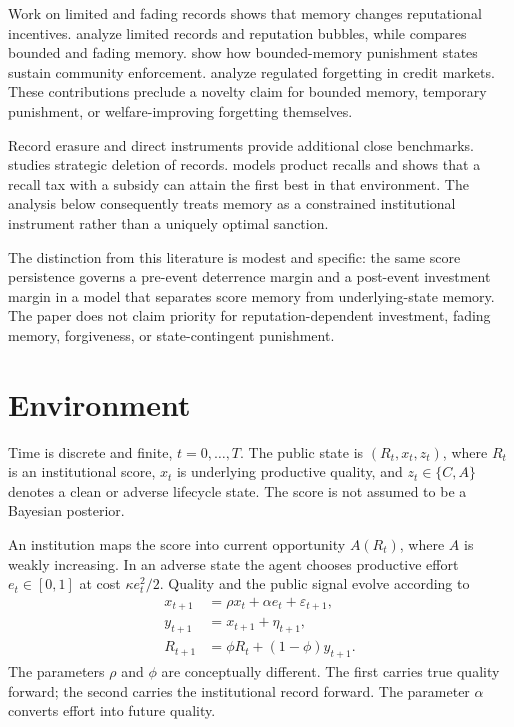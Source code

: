 \documentclass[11pt]{article}
\begin{document}
Work on limited and fading records shows that memory changes reputational incentives. \citet{liuskrzypacz2014} analyze limited records and reputation bubbles, while \citet{sperisen2018} compares bounded and fading memory. \citet{bhaskarthomas2019} show how bounded-memory punishment states sustain community enforcement. \citet{elulgottardi2015} analyze regulated forgetting in credit markets. These contributions preclude a novelty claim for bounded memory, temporary punishment, or welfare-improving forgetting themselves.

Record erasure and direct instruments provide additional close benchmarks. \citet{pei2026} studies strategic deletion of records. \citet{jovanovic2021} models product recalls and shows that a recall tax with a subsidy can attain the first best in that environment. The analysis below consequently treats memory as a constrained institutional instrument rather than a uniquely optimal sanction.

The distinction from this literature is modest and specific: the same score persistence governs a pre-event deterrence margin and a post-event investment margin in a model that separates score memory from underlying-state memory. The paper does not claim priority for reputation-dependent investment, fading memory, forgiveness, or state-contingent punishment.

\section{Environment}

Time is discrete and finite, $t=0,\ldots,T$. The public state is $(R_t,x_t,z_t)$, where $R_t$ is an institutional score, $x_t$ is underlying productive quality, and $z_t\in\{C,A\}$ denotes a clean or adverse lifecycle state. The score is not assumed to be a Bayesian posterior.

An institution maps the score into current opportunity $A(R_t)$, where $A$ is weakly increasing. In an adverse state the agent chooses productive effort $e_t\in[0,1]$ at cost $\kappa e_t^2/2$. Quality and the public signal evolve according to
\begin{align}
x_{t+1}&=\rho x_t+\alpha e_t+\varepsilon_{t+1},\\
y_{t+1}&=x_{t+1}+\eta_{t+1},\\
R_{t+1}&=\phi R_t+(1-\phi)y_{t+1}.
\end{align}
The parameters $\rho$ and $\phi$ are conceptually different. The first carries true quality forward; the second carries the institutional record forward. The parameter $\alpha$ converts effort into future quality.
\end{document}
